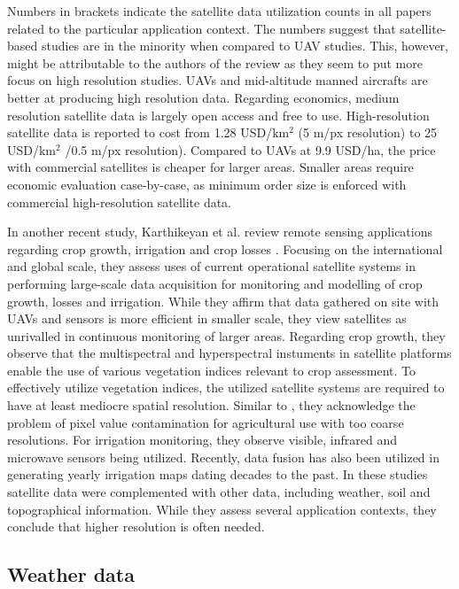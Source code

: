 Numbers in brackets indicate the satellite data utilization counts in all papers related to the particular application context. The numbers suggest that satellite-based studies are in the minority when compared to UAV studies. This, however, might be attributable to the authors of the review as they seem to put more focus on high resolution studies. UAVs and mid-altitude manned aircrafts are better at producing high resolution data. Regarding economics, medium resolution satellite data is largely open access and free to use. High-resolution satellite data is reported to cost from 1.28 USD/km$^2$ (5 m/px resolution) to 25 USD/km$^2$ /0.5 m/px resolution). Compared to UAVs at 9.9 USD/ha, the price with commercial satellites is cheaper for larger areas. Smaller areas require economic evaluation case-by-case, as minimum order size is enforced with commercial high-resolution satellite data.

In another recent study, Karthikeyan et al. review remote sensing applications regarding crop growth, irrigation and crop losses \cite{Karthikeyan2020}. Focusing on the international and global scale, they assess uses of current operational satellite systems in performing large-scale data acquisition for monitoring and modelling of crop growth, losses and irrigation. While they affirm that data gathered on site with UAVs and sensors is more efficient in smaller scale, they view satellites as unrivalled in continuous monitoring of larger areas. Regarding crop growth, they observe that the multispectral and hyperspectral instuments in satellite platforms enable the use of various vegetation indices relevant to crop assessment. To effectively utilize vegetation indices, the utilized satellite systems are required to have at least mediocre spatial resolution. Similar to \cite{Chivasa2017}, they acknowledge the problem of pixel value contamination for agricultural use with too coarse resolutions. For irrigation monitoring, they observe visible, infrared and microwave sensors being utilized. Recently, data fusion has also been utilized in generating yearly irrigation maps dating decades to the past. In these studies satellite data were complemented with other data, including weather, soil and topographical information. While they assess several application contexts, they conclude that higher resolution is often needed.


\subsection{Weather data}
\label{subsec:data-weather-review}

